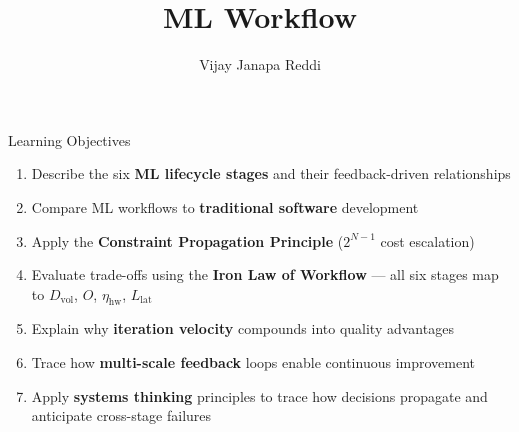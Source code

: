 \documentclass[aspectratio=169, 12pt]{beamer}
\title{ML Workflow}
\author{Vijay Janapa Reddi}
\institute{Harvard University}
\date{}
\begin{document}

\begin{frame}{Learning Objectives}
\note{
%
%
}

\small
\begin{enumerate}
  \item Describe the six \textbf{ML lifecycle stages} and their feedback-driven relationships
  \item Compare ML workflows to \textbf{traditional software} development
  \item Apply the \textbf{Constraint Propagation Principle} ($2^{N-1}$ cost escalation)
  \item Evaluate trade-offs using the \textbf{Iron Law of Workflow} --- all six stages map to $D_{\text{vol}}$, $O$, $\eta_{\text{hw}}$, $L_{\text{lat}}$
  \item Explain why \textbf{iteration velocity} compounds into quality advantages
  \item Trace how \textbf{multi-scale feedback} loops enable continuous improvement
  \item Apply \textbf{systems thinking} principles to trace how decisions propagate and anticipate cross-stage failures
\end{enumerate}

\end{frame}
\end{document}

